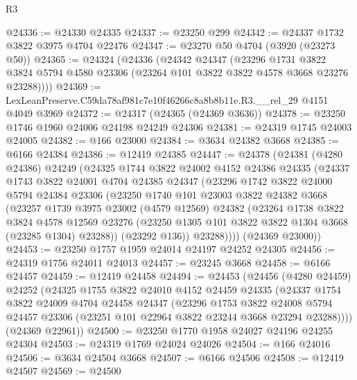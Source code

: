 \begin{lexlean}{R3}
\begin{coremodule}
@24336 := @24330 @24335
@24337 := @23250 @299
@24342 := @24337 @1732 @3822 @3975 @4704 @22476
@24347 := @23270 @50 @4704 (@3920 (@23273 @50))
@24365 := @24324
    (@24336
      (@24342
        @24347
        (@23296
          @1731
          @3822
          @3824
          @5794
          @4580
          @23306
          (@23264 @101 @3822 @3822 @4578 @3668 @23276 @23288))))
@24369 := LexLeanPreserve.C59da78af981c7e10f46266c8a8b8b11e.R3.__rel_29 @4151 @4049 @3969
@24372 := @24317 (@24365 (@24369 @3636))
@24378 := @23250 @1746 @1960 @24006 @24198 @24249 @24306
@24381 := @24319 @1745 @24003 @24005
@24382 := @166 @23000
@24384 := @3634 @24382 @3668
@24385 := @6166 @24384
@24386 := @12419 @24385
@24447 := @24378
    (@24381
      (@4280 @24386)
      @24249
      (@24325
        @1744
        @3822
        @24002
        @4152
        @24386
        @24335
        (@24337
          @1743
          @3822
          @24001
          @4704
          @24385
          @24347
          (@23296
            @1742
            @3822
            @24000
            @5794
            @24384
            @23306
            (@23250
              @1740
              @101
              @23003
              @3822
              @24382
              @3668
              (@23257
                @1739
                @3975
                @23002
                (@4579 @12569)
                @24382
                (@23264
                  @1738
                  @3822
                  @3824
                  @4578
                  @12569
                  @23276
                  (@23250 @1305 @101 @3822 @3822 @1304 @3668 (@23285 @1304) @23288))
                (@23292 @136))
              @23288))))
      (@24369 @23000))
@24453 := @23250 @1757 @1959 @24014 @24197 @24252 @24305
@24456 := @24319 @1756 @24011 @24013
@24457 := @23245 @3668
@24458 := @6166 @24457
@24459 := @12419 @24458
@24494 := @24453
    (@24456
      (@4280 @24459)
      @24252
      (@24325
        @1755
        @3822
        @24010
        @4152
        @24459
        @24335
        (@24337
          @1754
          @3822
          @24009
          @4704
          @24458
          @24347
          (@23296
            @1753
            @3822
            @24008
            @5794
            @24457
            @23306
            (@23251 @101 @22964 @3822 @23244 @3668 @23294 @23288))))
      (@24369 @22961))
@24500 := @23250 @1770 @1958 @24027 @24196 @24255 @24304
@24503 := @24319 @1769 @24024 @24026
@24504 := @166 @24016
@24506 := @3634 @24504 @3668
@24507 := @6166 @24506
@24508 := @12419 @24507
@24569 := @24500

\end{coremodule}
\end{lexlean}
